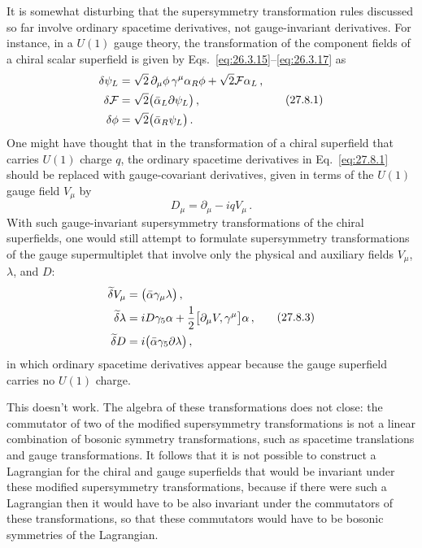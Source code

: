 It is somewhat disturbing that the supersymmetry transformation rules
discussed so far involve ordinary spacetime derivatives, not gauge-invariant
derivatives. For instance, in a \(U(1)\) gauge theory, the transformation of
the component fields of a chiral scalar superfield is given by
Eqs.~\eqref{eq:26.3.15}--\eqref{eq:26.3.17} as
\begin{equation}
  \begin{aligned}
    \delta\psi_L
    &=\sqrt{2}\,\partial_\mu\phi\,\gamma^\mu\alpha_R\phi
      +\sqrt{2}\mathcal{F}\alpha_L\,,\\
    \delta\mathcal{F}
    &=\sqrt{2}\bigl(\bar\alpha_L\sl{\partial}\psi_L\bigr)\,,\\
    \delta\phi
    &=\sqrt{2}\bigl(\bar\alpha_R\psi_L\bigr)\,.
  \end{aligned}
  \tag{27.8.1}\label{eq:27.8.1}
\end{equation}
One might have thought that in the transformation of a chiral superfield
that carries \(U(1)\) charge \(q\), the ordinary spacetime derivatives in
Eq.~\eqref{eq:27.8.1} should be replaced with gauge-covariant derivatives,
given in terms of the \(U(1)\) gauge field \(V_\mu\) by
\begin{equation}
  D_\mu=\partial_\mu-iqV_\mu\,.
  \tag{27.8.2}\label{eq:27.8.2}
\end{equation}
With such gauge-invariant supersymmetry transformations of the chiral
superfields, one would still attempt to formulate supersymmetry
transformations of the gauge supermultiplet that involve only the physical
and auxiliary fields \(V_\mu\), \(\lambda\), and \(D\):
\begin{equation}
  \begin{aligned}
    \widetilde{\delta}V_\mu
    &=\bigl(\bar\alpha\gamma_\mu\lambda\bigr)\,,\\
    \widetilde{\delta}\lambda
    &=iD\gamma_5\alpha
      +\frac12\bigl[\partial_\mu\sl{V},\gamma^\mu\bigr]\alpha\,,\\
    \widetilde{\delta}D
    &=i\bigl(\bar\alpha\gamma_5\sl{\partial}\lambda\bigr)\,,
  \end{aligned}
  \tag{27.8.3}\label{eq:27.8.3}
\end{equation}
in which ordinary spacetime derivatives appear because the gauge superfield
carries no \(U(1)\) charge.

This doesn't work. The algebra of these transformations does not close: the
commutator of two of the modified supersymmetry transformations is not a
linear combination of bosonic symmetry transformations, such as spacetime
translations and gauge transformations. It follows that it is not possible
to construct a Lagrangian for the chiral and gauge superfields that would be
invariant under these modified supersymmetry transformations, because if
there were such a Lagrangian then it would have to be also invariant under
the commutators of these transformations, so that these commutators would
have to be bosonic symmetries of the Lagrangian.

